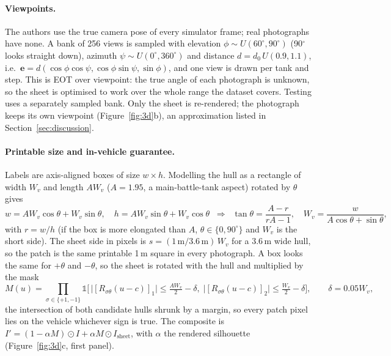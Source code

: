 \documentclass[11pt,a4paper]{article}
\begin{document}
\paragraph{Viewpoints.} The authors use the true camera pose of every simulator frame; real photographs have none. A bank of 256 views is sampled with elevation $\phi\sim U(60^\circ,90^\circ)$ (90$^\circ$ looks straight down), azimuth $\psi\sim U(0^\circ,360^\circ)$ and distance $d=d_0\,U(0.9,1.1)$, i.e.\ $\mathbf{e}=d(\cos\phi\cos\psi,\cos\phi\sin\psi,\sin\phi)$, and one view is drawn per tank and step. This is EOT over viewpoint: the true angle of each photograph is unknown, so the sheet is optimised to work over the whole range the dataset covers. Testing uses a separately sampled bank. Only the sheet is re-rendered; the photograph keeps its own viewpoint (Figure~\ref{fig:3d}b), an approximation listed in Section~\ref{sec:discussion}.

\paragraph{Printable size and in-vehicle guarantee.} Labels are axis-aligned boxes of size $w\times h$. Modelling the hull as a rectangle of width $W_v$ and length $AW_v$ ($A=1.95$, a main-battle-tank aspect) rotated by $\theta$ gives
\begin{equation}
w=AW_v\cos\theta+W_v\sin\theta,\quad h=AW_v\sin\theta+W_v\cos\theta
\;\;\Rightarrow\;\;
\tan\theta=\frac{A-r}{rA-1},\quad W_v=\frac{w}{A\cos\theta+\sin\theta},
\end{equation}
with $r=w/h$ (if the box is more elongated than $A$, $\theta\in\{0,90^\circ\}$ and $W_v$ is the short side).
The sheet side in pixels is $s=(1\,\text{m}/3.6\,\text{m})\,W_v$ for a 3.6\,m wide hull, so the patch is the same printable 1\,m square in every photograph. A box looks the same for $+\theta$ and $-\theta$, so the sheet is rotated with the hull and multiplied by the mask
\begin{equation}
M(u)=\prod_{\sigma\in\{+1,-1\}}\mathbb{1}\Big[\,\big|[R_{\sigma\theta}(u-c)]_1\big|\le\tfrac{AW_v}{2}-\delta,\;\big|[R_{\sigma\theta}(u-c)]_2\big|\le\tfrac{W_v}{2}-\delta\Big],\qquad\delta=0.05W_v,
\end{equation}
the intersection of both candidate hulls shrunk by a margin, so every patch pixel lies on the vehicle whichever sign is true. The composite is $I'=(1-\alpha M)\odot I+\alpha M\odot I_{\text{sheet}}$, with $\alpha$ the rendered silhouette (Figure~\ref{fig:3d}c, first panel).
\end{document}
